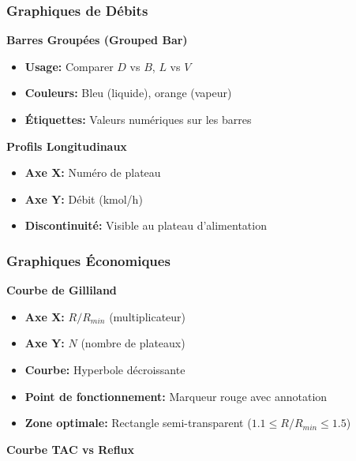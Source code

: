 \documentclass[11pt,a4paper]{article}
\begin{document}
\subsubsection{Graphiques de Débits}

\textbf{Barres Groupées (Grouped Bar)}

\begin{itemize}[leftmargin=*]
    \item \textbf{Usage:} Comparer $D$ vs $B$, $L$ vs $V$
    \item \textbf{Couleurs:} Bleu (liquide), orange (vapeur)
    \item \textbf{Étiquettes:} Valeurs numériques sur les barres
\end{itemize}

\textbf{Profils Longitudinaux}

\begin{itemize}[leftmargin=*]
    \item \textbf{Axe X:} Numéro de plateau
    \item \textbf{Axe Y:} Débit (kmol/h)
    \item \textbf{Discontinuité:} Visible au plateau d'alimentation
\end{itemize}

\subsubsection{Graphiques Économiques}

\textbf{Courbe de Gilliland}

\begin{itemize}[leftmargin=*]
    \item \textbf{Axe X:} $R/R_{min}$ (multiplicateur)
    \item \textbf{Axe Y:} $N$ (nombre de plateaux)
    \item \textbf{Courbe:} Hyperbole décroissante
    \item \textbf{Point de fonctionnement:} Marqueur rouge avec annotation
    \item \textbf{Zone optimale:} Rectangle semi-transparent ($1.1 \leq R/R_{min} \leq 1.5$)
\end{itemize}

\textbf{Courbe TAC vs Reflux}
\end{document}
